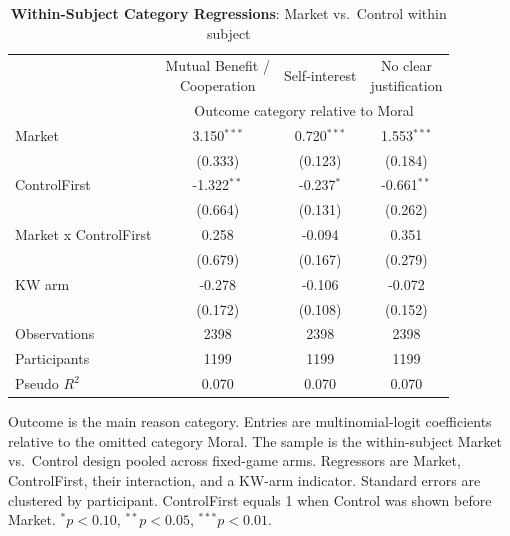 \begin{table}[!htbp]
\centering
\caption{\textbf{Within-Subject Category Regressions}: Market vs.\ Control within subject}
\label{tab:within_market_category_regressions}
\begin{tabular}{lccc}
\toprule
 & \shortstack{Mutual Benefit /\\ Cooperation} & Self-interest & \shortstack{No clear\\ justification} \\
 & \multicolumn{3}{c}{Outcome category relative to Moral} \\
\cmidrule(lr){2-4}
\midrule
Market & 3.150$^{***}$ & 0.720$^{***}$ & 1.553$^{***}$ \\
 & (0.333) & (0.123) & (0.184) \\
ControlFirst & -1.322$^{**}$ & -0.237$^{*}$ & -0.661$^{**}$ \\
 & (0.664) & (0.131) & (0.262) \\
Market x ControlFirst & 0.258 & -0.094 & 0.351 \\
 & (0.679) & (0.167) & (0.279) \\
KW arm & -0.278 & -0.106 & -0.072 \\
 & (0.172) & (0.108) & (0.152) \\
Observations & 2398 & 2398 & 2398 \\
Participants & 1199 & 1199 & 1199 \\
Pseudo $R^2$ & 0.070 & 0.070 & 0.070 \\
\bottomrule
\end{tabular}
\begin{flushleft}
\footnotesize Outcome is the main reason category. Entries are multinomial-logit coefficients relative to the omitted category Moral. The sample is the within-subject Market vs.\ Control design pooled across fixed-game arms. Regressors are Market, ControlFirst, their interaction, and a KW-arm indicator. Standard errors are clustered by participant. ControlFirst equals 1 when Control was shown before Market. $^{*}p<0.10$, $^{**}p<0.05$, $^{***}p<0.01$.
\end{flushleft}
\end{table}
